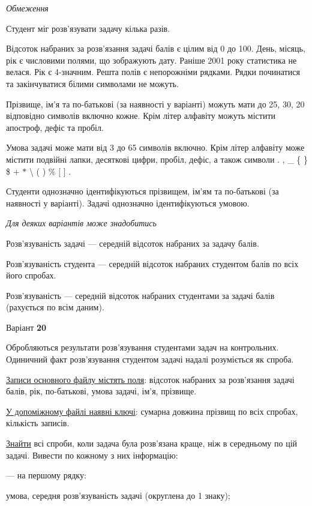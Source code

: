 \documentclass[11pt, ukrainian]{article}
\begin{document}

\bigskip\textit{Обмеження}

Студент міг розв’язувати задачу кілька разів.

Відсоток набраних за розв’язання задачі балів є цілим від 0 до 100.
День, місяць, рік є числовими полями, що зображують дату.
Раніше 2001 року статистика не велася. Рік є 4-значним.
Решта полів є непорожніми рядками.
Рядки починатися та закінчуватися білими символами не можуть.

Прізвище, ім’я та по-батькові (за наявності у варіанті) можуть мати до 25, 30, 20 відповідно символів включно кожне. 
Крім літер алфавіту можуть містити апостроф, дефіс та пробіл.

Умова задачі може мати від 3 до 65 символів включно.
Крім літер алфавіту може містити подвійні лапки, десяткові цифри, пробіл, дефіс,
а також символи . , \_ \{ \} \$ $+$ $*$ {\textbackslash} ( ) \% $[$ $]$ .

Студенти однозначно ідентифікуються прізвищем, ім’ям та по-батькові (за наявності у варіанті).
Задачі однозначно ідентифікуються умовою.

\bigskip\textit{Для деяких варіантів може знадобитись}

Розв'язуваність задачі --- середній відсоток набраних за задачу балів.

Розв'язуваність студента --- середній відсоток набраних студентом балів по всіх його спробах.

Розв'язуваність --- середній відсоток набраних студентами за задачі балів (рахується по всім даним).


\par
\newpage
{\center Варіант  \No \textbf { 20 }\par}
\bigskip
Обробляються результати розв’язування студентами задач на контрольних.
Одиничний факт роз\-в’я\-зу\-вання студентом задачі надалі розуміється як спроба.

\underline{Записи основного файлу містять поля}: відсоток набраних за розв’язання задачі балів, рік, по-бать\-ко\-ві, умова задачі, ім’я, прізвище.

\underline{У допоміжному файлі наявні ключі}: сумарна довжина прізвищ по всіх спробах, кількість записів.

\underline{Знайти} всі спроби, коли задача була розв’язана краще, ніж в середньому по цій задачі. Вивести по кожному з них інформацію:\par
{\noindent}--- на першому рядку:\par
умова, середня розв’язуваність задачі (округлена до 1 знаку);
\end{document}
